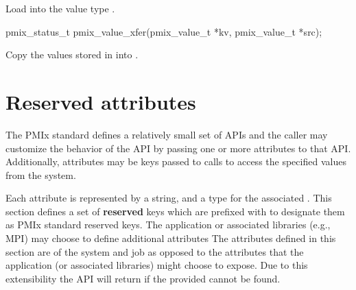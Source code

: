 \begin{arglist}
\end{arglist}

\descr

Load  into the value type .

\format

\cspecificstart
\begin{codepar}
pmix_status_t
pmix_value_xfer(pmix_value_t *kv, pmix_value_t *src);
\end{codepar}
\cspecificend

\begin{arglist}
\end{arglist}

\descr

Copy the values stored in  into .



\section{Reserved attributes}
\label{api:struct:attributes}

The PMIx standard defines a relatively small set of APIs and the caller may customize the behavior of the API by passing one or more attributes to that API.
Additionally, attributes may be keys passed to  calls to access the specified values from the system.

Each attribute is represented by a  string, and a type for the associated .
This section defines a set of \textbf{reserved} keys which are prefixed with  to designate them as PMIx standard reserved keys.
The application or associated libraries (e.g., \ac{MPI}) may choose to define additional attributes
The attributes defined in this section are of the system and job as opposed to the attributes that the application (or associated libraries) might choose to expose.
Due to this extensibility the  API will return  if the provided  cannot be found.



